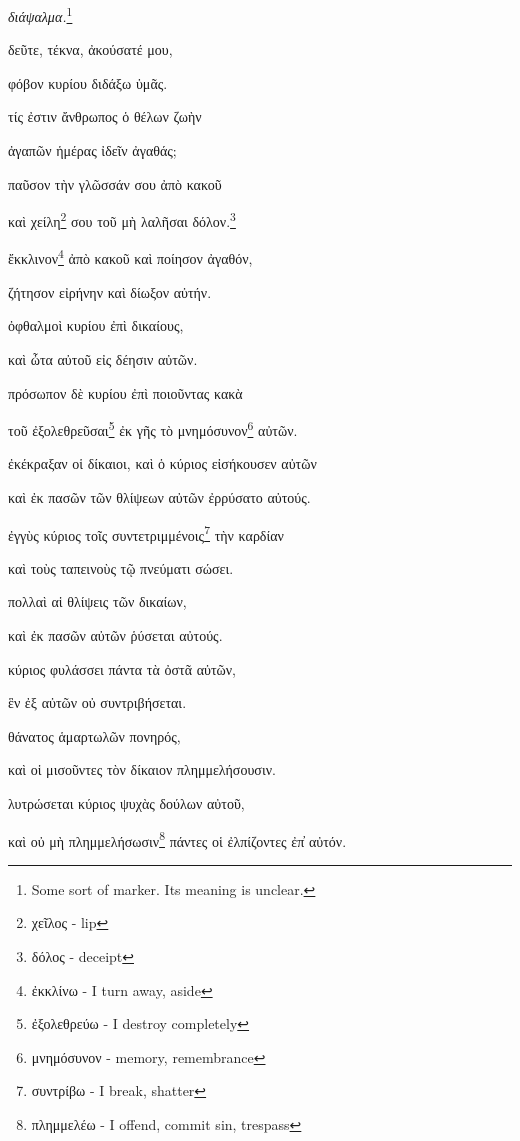 \textit{διάψαλμα.}\footnote{Some sort of marker. Its meaning is unclear.}

δεῦτε,
τέκνα,
ἀκούσατέ
μου,

φόβον
κυρίου
διδάξω
ὑμᾶς.

τίς
ἐστιν
ἄνθρωπος
ὁ
θέλων
ζωὴν

ἀγαπῶν
ἡμέρας
ἰδεῖν
ἀγαθάς;

παῦσον
τὴν
γλῶσσάν
σου
ἀπὸ
κακοῦ

καὶ
χείλη\footnote{χεῖλος - lip}
σου
τοῦ
μὴ
λαλῆσαι
δόλον.\footnote{δόλος - deceipt}

ἔκκλινον\footnote{ἐκκλίνω - I turn away, aside}
ἀπὸ
κακοῦ
καὶ
ποίησον
ἀγαθόν,

ζήτησον
εἰρήνην
καὶ
δίωξον
αὐτήν.

ὀφθαλμοὶ
κυρίου
ἐπὶ
δικαίους,

καὶ
ὦτα
αὐτοῦ
εἰς
δέησιν
αὐτῶν.

πρόσωπον
δὲ
κυρίου
ἐπὶ
ποιοῦντας
κακὰ

τοῦ
ἐξολεθρεῦσαι\footnote{ἐξολεθρεύω - I destroy completely}
ἐκ
γῆς
τὸ
μνημόσυνον\footnote{μνημόσυνον - memory, remembrance}
αὐτῶν.

ἐκέκραξαν
οἱ
δίκαιοι,
καὶ
ὁ
κύριος
εἰσήκουσεν
αὐτῶν

καὶ
ἐκ
πασῶν
τῶν
θλίψεων
αὐτῶν
ἐρρύσατο
αὐτούς.

ἐγγὺς
κύριος
τοῖς
συντετριμμένοις\footnote{συντρίβω - I break, shatter}
τὴν
καρδίαν

καὶ
τοὺς
ταπεινοὺς
τῷ
πνεύματι
σώσει.

πολλαὶ
αἱ
θλίψεις
τῶν
δικαίων,

καὶ
ἐκ
πασῶν
αὐτῶν
ῥύσεται
αὐτούς.

κύριος
φυλάσσει
πάντα
τὰ
ὀστᾶ
αὐτῶν,

ἓν
ἐξ
αὐτῶν
οὐ
συντριβήσεται.

θάνατος
ἁμαρτωλῶν
πονηρός,

καὶ
οἱ
μισοῦντες
τὸν
δίκαιον
πλημμελήσουσιν.

λυτρώσεται
κύριος
ψυχὰς
δούλων
αὐτοῦ,

καὶ
οὐ
μὴ
πλημμελήσωσιν\footnote{πλημμελέω - I offend, commit sin, trespass}
πάντες
οἱ
ἐλπίζοντες
ἐπ̓
αὐτόν. 